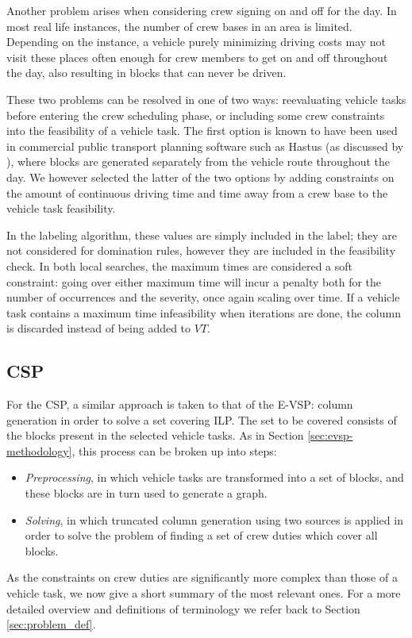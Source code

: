 \documentclass[]{article}
\begin{document}
Another problem arises when considering crew signing on and off for the day. In most real life instances, the number of crew bases in an area is limited. Depending on the instance, a vehicle purely minimizing driving costs may not visit these places often enough for crew members to get on and off throughout the day, also resulting in blocks that can never be driven.   

These two problems can be resolved in one of two ways: reevaluating vehicle tasks before entering the crew scheduling phase, or including some crew constraints into the feasibility of a vehicle task. The first option is known to have been used in commercial public transport planning software such as Hastus (as discussed by \citet{Hastus90}), where blocks are generated separately from the vehicle route throughout the day. We however selected the latter of the two options by adding constraints on the amount of continuous driving time and time away from a crew base to the vehicle task feasibility.

In the labeling algorithm, these values are simply included in the label; they are not considered for domination rules, however they are included in the feasibility check. In both local searches, the maximum times are considered a soft constraint: going over either maximum time will incur a penalty both for the number of occurrences and the severity, once again scaling over time. If a vehicle task contains a maximum time infeasibility when iterations are done, the column is discarded instead of being added to $VT$.

\subsection{CSP} \label{sec:csp-methodology}
For the CSP, a similar approach is taken to that of the E-VSP: column generation in order to solve a set covering ILP. The set to be covered consists of the blocks present in the selected vehicle tasks. As in Section \ref{sec:evsp-methodology}, this process can be broken up into steps: 
\begin{itemize}
  \item \textit{Preprocessing}, in which vehicle tasks are transformed into a set of blocks, and these blocks are in turn used to generate a graph. 
  \item \textit{Solving}, in which truncated column generation using two sources is applied in order to solve the problem of finding a set of crew duties which cover all blocks. 
\end{itemize} 
As the constraints on crew duties are significantly more complex than those of a vehicle task, we now give a short summary of the most relevant ones. For a more detailed overview and definitions of terminology we refer back to Section \ref{sec:problem_def}.
\end{document}
